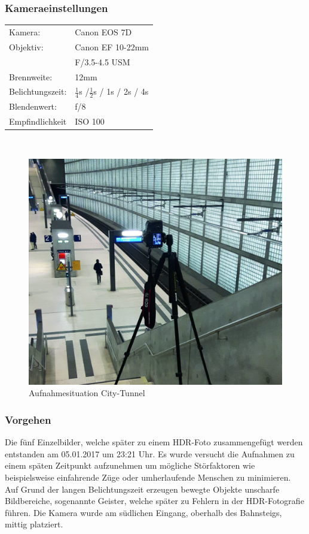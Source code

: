 \documentclass[liststotoc,bibtotoc,fontsize=14pt,]{scrreprt}
\begin{document}
	\subsubsection{Kameraeinstellungen}
	\begin{minipage}{0.58\textwidth}
		\begin{tabular}{ll}
			Kamera: &Canon EOS 7D \\
			Objektiv: &Canon EF 10-22mm \\
			& F/3.5-4.5 USM\\		
			Brennweite:& 12mm \\
			Belichtungszeit: & $\frac{1}{4}$s /$\frac{1}{2}$s / 1s / 2s / 4s\\
			Blendenwert: & f/8\\
			Empfindlichkeit & ISO 100 \\
		\end{tabular}\\
	\end{minipage}%
	\begin{minipage}{0.42\textwidth}
		\begin{figure}[H]
			\includegraphics[width=\linewidth]{img/places/leuscher.jpg}
			\caption{Aufnahmesituation City-Tunnel}
			\label{img:ak}
		\end{figure}
	\end{minipage}%
		

	
	\subsubsection{Vorgehen}
	Die fünf Einzelbilder, welche später zu einem HDR-Foto zusammengefügt werden entstanden am 05.01.2017 um 23:21 Uhr. Es wurde versucht die Aufnahmen zu einem späten Zeitpunkt aufzunehmen um mögliche Störfaktoren wie beispielsweise einfahrende Züge oder umherlaufende Menschen zu minimieren. Auf Grund der langen Belichtungszeit erzeugen bewegte Objekte unscharfe Bildbereiche, sogenannte Geister, welche später zu Fehlern in der HDR-Fotografie führen. Die Kamera wurde am südlichen Eingang, oberhalb des Bahnsteigs, mittig platziert.
\end{document}
